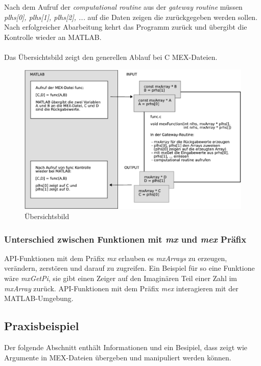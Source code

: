 \documentclass[10pt, bigheadings]{scrartcl}
\begin{document}
Nach dem Aufruf der \textit{computational routine} aus der
\textit{gateway routine} müssen \textit{plhs[0], plhs[1], plhs[2], ...}
auf die Daten zeigen die zurückgegeben werden sollen.
Nach erfolgreicher Abarbeitung kehrt das Programm
zurück und übergibt die Kontrolle wieder an MATLAB.\\\\
Das Übersichtsbild zeigt den generellen Ablauf bei C MEX-Dateien.\\
\begin{figure}[ht]
\begin{center}
\includegraphics[width=14cm]{matlab-mex.eps}
\caption{Übersichtsbild}
\end{center}
\end{figure}

\subsubsection*{Unterschied zwischen Funktionen mit \textit{mx} und \textit{mex}
Präfix} 
API-Funktionen mit dem Präfix \textit{mx} erlauben es \textit{mxArrays} zu
erzeugen, verändern, zerstören und darauf zu zugreifen. Ein Beispiel für so eine
Funktione wäre \textit{mxGetPi}, sie gibt einen Zeiger auf den Imaginären
Teil einer Zahl im \textit{mxArray} zurück. API-Funktionen mit dem Präfix
\textit{mex} interagieren mit der MATLAB-Umgebung.

\subsection{Praxisbeispiel}
Der folgende Abschnitt enthält Informationen und ein Besipiel,
dass zeigt wie Argumente in MEX-Dateien übergeben und
manipuliert werden können.
\end{document}
